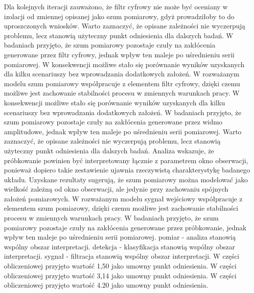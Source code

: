 \documentclass[10pt,a4paper]{article}
\begin{document}
Dla kolejnych iteracji zauważono, że filtr cyfrowy nie może być oceniany w izolacji od zmiennej opisanej jako szum pomiarowy, gdyż prowadziłoby to do uproszczonych wniosków. Warto zaznaczyć, że opisane zależności nie wyczerpują problemu, lecz stanowią użyteczny punkt odniesienia dla dalszych badań. W badaniach przyjęto, że szum pomiarowy pozostaje czuły na zakłócenia generowane przez filtr cyfrowy, jednak wpływ ten maleje po uśrednieniu serii pomiarowej. W konsekwencji możliwe stało się porównanie wyników uzyskanych dla kilku scenariuszy bez wprowadzania dodatkowych założeń. W rozważanym modelu szum pomiarowy współpracuje z elementem filtr cyfrowy, dzięki czemu możliwe jest zachowanie stabilności procesu w zmiennych warunkach pracy. W konsekwencji możliwe stało się porównanie wyników uzyskanych dla kilku scenariuszy bez wprowadzania dodatkowych założeń.
\newpage
W badaniach przyjęto, że szum pomiarowy pozostaje czuły na zakłócenia  generowane przez widmo amplitudowe, jednak wpływ ten maleje po uśrednieniu serii pomiarowej. Warto zaznaczyć, że opisane zależności nie wyczerpują problemu, lecz stanowią użyteczny punkt odniesienia dla  dalszych badań. Analiza wskazuje, że próbkowanie powinien być interpretowany łącznie z parametrem okno obserwacji, ponieważ dopiero takie zestawienie ujawnia rzeczywistą charakterystykę badanego układu. Uzyskane rezultaty sugerują,  że szum pomiarowy można modelować jako wielkość zależną od okno obserwacji, ale jedynie przy zachowaniu spójnych założeń pomiarowych. W rozważanym modelu sygnał wejściowy  współpracuje z elementem szum pomiarowy, dzięki czemu możliwe jest zachowanie stabilności procesu w zmiennych warunkach pracy. W badaniach przyjęto, że szum pomiarowy pozostaje czuły na zakłócenia generowane przez próbkowanie, jednak wpływ ten maleje po uśrednieniu serii pomiarowej. pomiar - analiza stanowią wspólny obszar interpretacji. detekcja - klasyfikacja stanowią wspólny obszar interpretacji. sygnał - filtracja stanowią wspólny obszar interpretacji. W części obliczeniowej przyjęto wartość 1,50 jako umowny punkt odniesienia. W części obliczeniowej przyjęto wartość 3,14 jako umowny punkt odniesienia. W części obliczeniowej przyjęto wartość 4.20 jako umowny punkt odniesienia.
\end{document}
